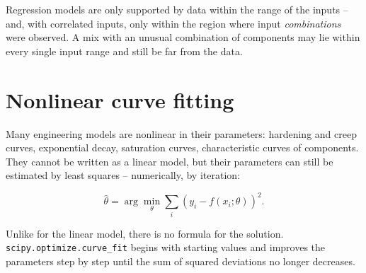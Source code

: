 \documentclass[
  letterpaper,
  DIV=11,
  numbers=noendperiod]{scrreprt}
\begin{document}
\begin{tcolorbox}[enhanced jigsaw, left=2mm, title=\textcolor{quarto-callout-warning-color}{\faExclamationTriangle}\hspace{0.5em}{Pitfall: extrapolation}, opacityback=0, breakable, rightrule=.15mm, arc=.35mm, toptitle=1mm, colbacktitle=quarto-callout-warning-color!10!white, opacitybacktitle=0.6, coltitle=black, colframe=quarto-callout-warning-color-frame, bottomrule=.15mm, leftrule=.75mm, bottomtitle=1mm, titlerule=0mm, toprule=.15mm, colback=white]

Regression models are only supported by data within the range of the
inputs -- and, with correlated inputs, only within the region where
input \emph{combinations} were observed. A mix with an unusual
combination of components may lie within every single input range and
still be far from the data.

\end{tcolorbox}

\section{Nonlinear curve fitting}\label{nonlinear-curve-fitting}

Many engineering models are nonlinear in their parameters: hardening and
creep curves, exponential decay, saturation curves, characteristic
curves of components. They cannot be written as a linear model, but
their parameters can still be estimated by least squares -- numerically,
by iteration:

\[\hat\theta = \arg\min_{\theta} \sum_i \left(y_i - f(x_i; \theta)\right)^2.\]

Unlike for the linear model, there is no formula for the solution.
\texttt{scipy.optimize.curve\_fit} begins with starting values and
improves the parameters step by step until the sum of squared deviations
no longer decreases.
\end{document}
